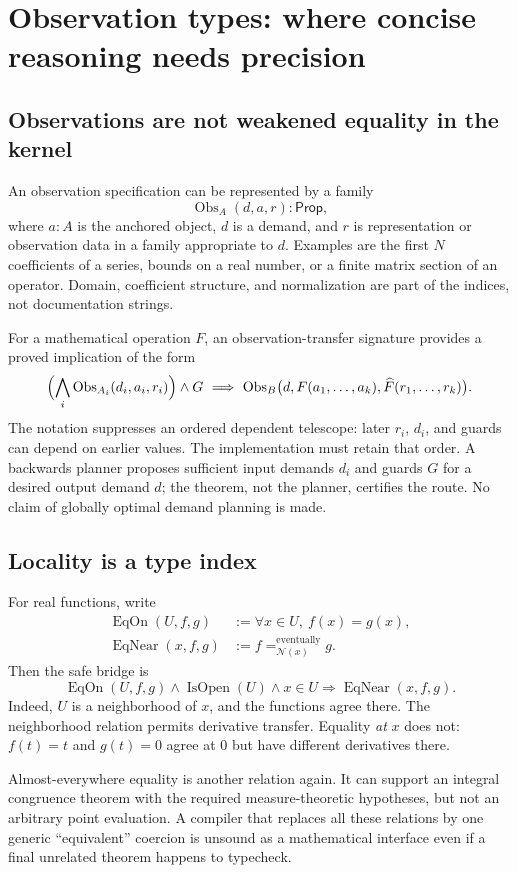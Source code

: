 \documentclass[11pt,letterpaper]{article}
\newcommand{\EqOn}{\operatorname{EqOn}}
\newcommand{\EqNear}{\operatorname{EqNear}}
\newcommand{\Obs}{\operatorname{Obs}}
\newcommand{\Prop}{\mathsf{Prop}}
\theoremstyle{definition}
\theoremstyle{remark}
\begin{document}
\section{Observation types: where concise reasoning needs precision}\label{sec:observations}

\subsection{Observations are not weakened equality in the kernel}
An observation specification can be represented by a family
\[
              \Obs_A(d,a,r):\Prop,
\]
where $a:A$ is the anchored object, $d$ is a demand, and $r$ is representation or
observation data in a family appropriate to $d$. Examples are the first $N$
coefficients of a series, bounds on a real number, or a finite matrix section of
an operator. Domain, coefficient structure, and normalization are part of the
indices, not documentation strings.

For a mathematical operation $F$, an observation-transfer signature provides a
proved implication of the form
\[
 \Bigl(\bigwedge_i \Obs_{A_i}(d_i,a_i,r_i)\Bigr)\wedge G
 \ \Longrightarrow\
 \Obs_B\bigl(d,F(a_1,\ldots,a_k),\widehat F(r_1,\ldots,r_k)\bigr).
\]
The notation suppresses an ordered dependent telescope: later $r_i$, $d_i$, and
guards can depend on earlier values. The implementation must retain that order.
A backwards planner proposes sufficient input demands $d_i$ and guards $G$ for
a desired output demand $d$; the theorem, not the planner, certifies the route.
No claim of globally optimal demand planning is made.

\subsection{Locality is a type index}
For real functions, write
\[
\begin{aligned}
 \EqOn(U,f,g)&:=\forall x\in U,\ f(x)=g(x),\\
 \EqNear(x,f,g)&:= f=^{\!\mathrm{eventually}}_{\mathcal N(x)}g.
\end{aligned}
\]
Then the safe bridge is
\[
 \EqOn(U,f,g)\wedge \operatorname{IsOpen}(U)\wedge x\in U
       \Longrightarrow \EqNear(x,f,g).
\]
Indeed, $U$ is a neighborhood of $x$, and the functions agree there. The
neighborhood relation permits derivative transfer. Equality \emph{at} $x$ does
not: $f(t)=t$ and $g(t)=0$ agree at $0$ but have different derivatives there.

Almost-everywhere equality is another relation again. It can support an integral
congruence theorem with the required measure-theoretic hypotheses, but not an
arbitrary point evaluation. A compiler that replaces all these relations by
one generic ``equivalent'' coercion is unsound as a mathematical interface even
if a final unrelated theorem happens to typecheck.
\end{document}
